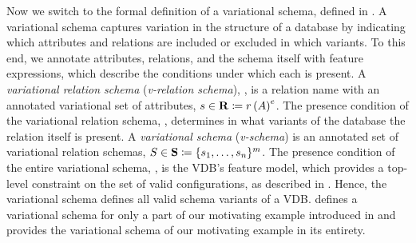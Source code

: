 Now we switch to the formal definition of a variational schema, defined in .
A variational schema captures variation in the structure of a database by indicating which attributes and relations are included or excluded in which variants.
%
To this end, we annotate attributes, relations, and the schema itself with
feature expressions,
which describe the conditions under which each is present.
%
A \emph{variational relation schema} (\emph{v-relation schema}), \vRelSch, is a relation name
with an annotated variational set of attributes,
$\synDef {\vRelSch} \vRelSchSet \eqq \vRelDef$.
The presence condition of the variational relation schema, \dimMeta, determines in what
variants of the database the relation itself is present.
%
A \emph{variational schema} (\emph{v-schema}) is an annotated set of variational relation 
schemas,
$\synDef \vSch \vSchSet \eqq \vSchDef$.
The presence condition of the entire variational schema, \fModel, is the VDB's feature
model, which provides a top-level constraint on the set of valid
configurations, as described in .
Hence, the variational schema defines all valid schema variants of a VDB. 
 defines a variational schema for only a part of our motivating example introduced in  and
  provides the variational schema of our motivating example in its entirety. 


